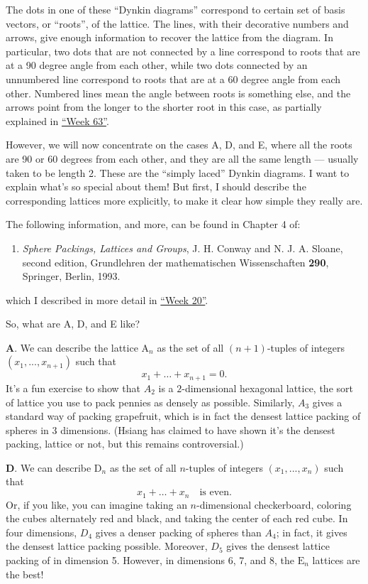 \documentclass{article}
\def\tightlist{}
\begin{document}
The dots in one of these ``Dynkin diagrams'' correspond to certain set
of basis vectors, or ``roots'', of the lattice. The lines, with their
decorative numbers and arrows, give enough information to recover the
lattice from the diagram. In particular, two dots that are not connected
by a line correspond to roots that are at a 90 degree angle from each
other, while two dots connected by an unnumbered line correspond to
roots that are at a 60 degree angle from each other. Numbered lines mean
the angle between roots is something else, and the arrows point from the
longer to the shorter root in this case, as partially explained in
\protect\hyperlink{week63}{``Week 63''}.

However, we will now concentrate on the cases A, D, and E, where all the
roots are 90 or 60 degrees from each other, and they are all the same
length --- usually taken to be length 2. These are the ``simply laced''
Dynkin diagrams. I want to explain what's so special about them! But
first, I should describe the corresponding lattices more explicitly, to
make it clear how simple they really are.

The following information, and more, can be found in Chapter 4 of:

\begin{enumerate}
\def\labelenumi{\arabic{enumi})}
\tightlist
\item
  \emph{Sphere Packings, Lattices and Groups}, J. H. Conway and N. J. A.
  Sloane, second edition, Grundlehren der mathematischen Wissenschaften
  \textbf{290}, Springer, Berlin, 1993.
\end{enumerate}

which I described in more detail in \protect\hyperlink{week20}{``Week
20''}.

So, what are A, D, and E like?

\textbf{A}. We can describe the lattice \(\mathrm{A}_n\) as the set of
all \((n+1)\)-tuples of integers \((x_1,...,x_{n+1})\) such that
\[x_1+\ldots+x_{n+1}=0.\] It's a fun exercise to show that \(A_2\) is a
\(2\)-dimensional hexagonal lattice, the sort of lattice you use to pack
pennies as densely as possible. Similarly, \(A_3\) gives a standard way
of packing grapefruit, which is in fact the densest lattice packing of
spheres in 3 dimensions. (Hsiang has claimed to have shown it's the
densest packing, lattice or not, but this remains controversial.)

\textbf{D}. We can describe \(\mathrm{D}_n\) as the set of all
\(n\)-tuples of integers \((x_1,...,x_n)\) such that
\[x_1+\ldots+x_n\quad\text{is even}.\] Or, if you like, you can imagine
taking an \(n\)-dimensional checkerboard, coloring the cubes alternately
red and black, and taking the center of each red cube. In four
dimensions, \(D_4\) gives a denser packing of spheres than \(A_4\); in
fact, it gives the densest lattice packing possible. Moreover, \(D_5\)
gives the densest lattice packing of in dimension 5. However, in
dimensions 6, 7, and 8, the \(\mathrm{E}_n\) lattices are the best!
\end{document}

